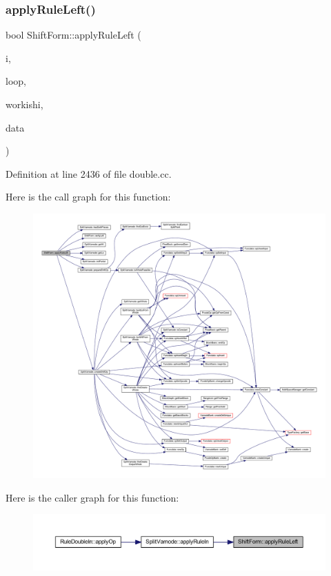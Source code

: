 \subsubsection{\texorpdfstring{applyRuleLeft()}{applyRuleLeft()}}
{\footnotesize\ttfamily bool Shift\+Form\+::apply\+Rule\+Left (\begin{DoxyParamCaption}\item[{\mbox{\hyperlink{class_split_varnode}{Split\+Varnode}} \&}]{i,  }\item[{\mbox{\hyperlink{class_pcode_op}{Pcode\+Op}} $\ast$}]{loop,  }\item[{bool}]{workishi,  }\item[{\mbox{\hyperlink{class_funcdata}{Funcdata}} \&}]{data }\end{DoxyParamCaption})}



Definition at line 2436 of file double.\+cc.

Here is the call graph for this function\+:
\nopagebreak
\begin{figure}[H]
\begin{center}
\leavevmode
\includegraphics[width=350pt]{class_shift_form_ac9a219e016a167cfd28280c8a9cd8520_cgraph}
\end{center}
\end{figure}
Here is the caller graph for this function\+:
\nopagebreak
\begin{figure}[H]
\begin{center}
\leavevmode
\includegraphics[width=350pt]{class_shift_form_ac9a219e016a167cfd28280c8a9cd8520_icgraph}
\end{center}
\end{figure}
\mbox{\label{class_shift_form_a2e6fa85729963eb0c4ae531edcc38d45}} 
